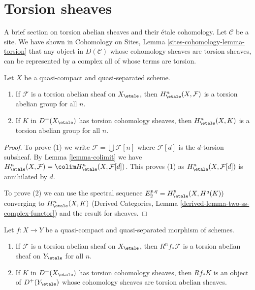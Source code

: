 \section{Torsion sheaves}
\label{section-torsion}

\noindent
A brief section on torsion abelian sheaves and their \'etale cohomology.
Let $\mathcal{C}$ be a site. We have shown in
Cohomology on Sites, Lemma \ref{sites-cohomology-lemma-torsion}
that any object in $D(\mathcal{C})$ whose cohomology sheaves are
torsion sheaves, can be represented by a complex all of whose terms
are torsion.

\begin{lemma}
\label{lemma-torsion-cohomology}
Let $X$ be a quasi-compact and quasi-separated scheme.
\begin{enumerate}
\item If $\mathcal{F}$ is a torsion abelian sheaf on $X_\etale$, then
$H^n_\etale(X, \mathcal{F})$ is a torsion abelian group for all $n$.
\item If $K$ in $D^+(X_\etale)$ has torsion cohomology sheaves, then
$H^n_\etale(X, K)$ is a torsion abelian group for all $n$.
\end{enumerate}
\end{lemma}

\begin{proof}
To prove (1) we write $\mathcal{F} = \bigcup \mathcal{F}[n]$ where
$\mathcal{F}[d]$ is the $d$-torsion subsheaf. By
Lemma \ref{lemma-colimit} we have
$H^n_\etale(X, \mathcal{F}) = \colim H^n_\etale(X, \mathcal{F}[d])$.
This proves (1) as $H^n_\etale(X, \mathcal{F}[d])$ is annihilated by $d$.

\medskip\noindent
To prove (2) we can use the spectral sequence
$E_2^{p, q} = H^p_\etale(X, H^q(K))$ converging to $H^n_\etale(X, K)$
(Derived Categories, Lemma \ref{derived-lemma-two-ss-complex-functor})
and the result for sheaves.
\end{proof}

\begin{lemma}
\label{lemma-torsion-direct-image}
Let $f : X \to Y$ be a quasi-compact and quasi-separated
morphism of schemes.
\begin{enumerate}
\item If $\mathcal{F}$ is a torsion abelian sheaf on $X_\etale$, then
$R^nf_*\mathcal{F}$ is a torsion abelian sheaf on $Y_\etale$ for all $n$.
\item If $K$ in $D^+(X_\etale)$ has torsion cohomology sheaves, then
$Rf_*K$ is an object of $D^+(Y_\etale)$ whose cohomology sheaves are
torsion abelian sheaves.
\end{enumerate}
\end{lemma}

